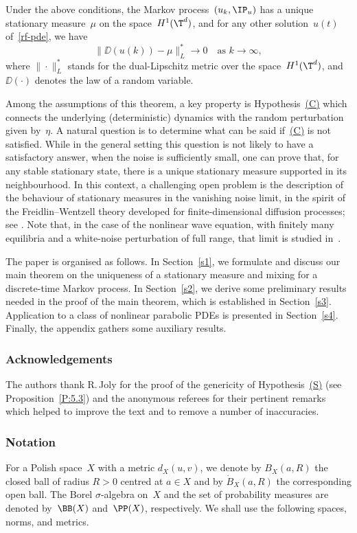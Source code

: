 \begin{mt}
Under the above conditions, the Markov process~$(u_k,\IP_u)$ has a unique stationary measure~$\mu$ on the space~$H^1(\T^d)$, and for any other solution~$u(t)$ of~\eqref{rf-pde}, we have
\[
\|\DD(u(k))-\mu\|_L^*\to0\quad\text{as $k\to\infty$},
\]
where $\|\cdot\|_L^*$ stands for the dual-Lipschitz metric over the space~$H^1(\T^d)$, and~$\DD(\cdot)$ denotes the law of a random variable.
\end{mt}

Among the assumptions of this theorem, a key property is Hypothesis~\hyperlink{C}{(C)} which connects the underlying (deterministic) dynamics with the random perturbation given by~$\eta$. A natural question is to determine what can be said if~\hyperlink{C}{(C)} is not satisfied. While in the general setting this question is not likely to have a satisfactory answer, when the noise is sufficiently small, one can prove that, for any stable stationary state, there is a unique stationary measure supported in its neighbourhood. In this context, a challenging open problem is the description of the behaviour of stationary measures in the vanishing noise limit, in the spirit of the Freidlin--Wentzell theory developed for finite-dimensional diffusion processes; see \cite[Chap.\,6]{FW1984}. Note that, in the case of the nonlinear wave equation, with finitely many equilibria and a white-noise perturbation of full range, that limit is studied in~\cite{martirosyan-2017}.

The paper is organised as follows. In Section~\ref{s1}, we formulate and discuss our main theorem on the uniqueness of a stationary measure and mixing for a discrete-time Markov process. In Section~\ref{s2}, we derive some preliminary results needed in the proof of the main theorem, which is established in Section~\ref{s3}. Application to a class of nonlinear parabolic PDEs is presented in Section~\ref{s4}. Finally, the appendix gathers some auxiliary results.

\subsubsection*{Acknowledgements}
The authors thank R.\,Joly for the proof of the genericity of Hypothesis~\hyperlink{S}{\rm(S)} (see Proposition~\ref{P:5.3}) and the anonymous referees for their pertinent remarks which helped to improve the text and to remove a number of inaccuracies.

\subsubsection*{Notation}
For a Polish space~$X$ with a metric $d_X(u,v)$, we denote by $B_X(a,R)$ the closed ball of radius $R > 0$ centred at $a\in X$ and by $\dot B_X(a,R)$ the corresponding open ball. The Borel $\sigma$-algebra on~$X$ and the set of probability measures are denoted by~$\BB(X)$ and~$\PP(X)$, respectively. We shall use the following spaces, norms, and metrics.

